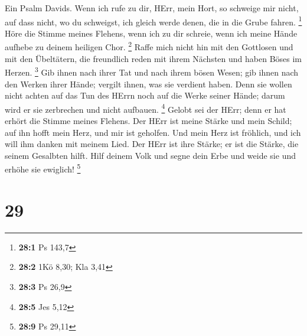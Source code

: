  Ein Psalm Davids. Wenn ich rufe zu dir, HErr, mein Hort, so
schweige mir nicht, auf dass nicht, wo du schweigst, ich gleich werde
denen, die in die Grube fahren. \footnote{\textbf{28:1} Ps 143,7}
 Höre die Stimme meines Flehens, wenn ich zu dir schreie,
wenn ich meine Hände aufhebe zu deinem heiligen Chor. \footnote{\textbf{28:2}
  1Kö 8,30; Kla 3,41}  Raffe mich nicht hin mit den
Gottlosen und mit den Übeltätern, die freundlich reden mit ihrem
Nächsten und haben Böses im Herzen. \footnote{\textbf{28:3} Ps 26,9}
 Gib ihnen nach ihrer Tat und nach ihrem bösen Wesen; gib
ihnen nach den Werken ihrer Hände; vergilt ihnen, was sie verdient
haben.  Denn sie wollen nicht achten auf das Tun des HErrn
noch auf die Werke seiner Hände; darum wird er sie zerbrechen und nicht
aufbauen. \footnote{\textbf{28:5} Jes 5,12}  Gelobt sei der
HErr; denn er hat erhört die Stimme meines Flehens.  Der
HErr ist meine Stärke und mein Schild; auf ihn hofft mein Herz, und mir
ist geholfen. Und mein Herz ist fröhlich, und ich will ihm danken mit
meinem Lied.  Der HErr ist ihre Stärke; er ist die Stärke,
die seinem Gesalbten hilft.  Hilf deinem Volk und segne dein
Erbe und weide sie und erhöhe sie ewiglich! \footnote{\textbf{28:9} Ps
  29,11}

\hypertarget{section-14}{%
\section{29}\label{section-14}}

